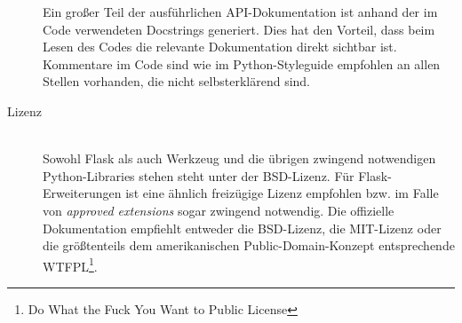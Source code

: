 \begin{description}
Ein großer Teil der ausführlichen API-Dokumentation ist anhand der im Code verwendeten Docstrings
generiert. Dies hat den Vorteil, dass beim Lesen des Codes die relevante Dokumentation direkt
sichtbar ist. Kommentare im Code sind wie im Python-Styleguide empfohlen an allen Stellen vorhanden,
die nicht selbsterklärend sind.

\newpage
\item[Lizenz] \hfill \\
Sowohl Flask als auch Werkzeug und die übrigen zwingend notwendigen Python-Libraries stehen steht
unter der BSD-Lizenz. Für Flask-Erweiterungen ist eine ähnlich freizügige Lizenz empfohlen bzw. im
Falle von \emph{approved extensions} sogar zwingend notwendig. Die offizielle Dokumentation
empfiehlt entweder die BSD-Lizenz, die MIT-Lizenz oder die größtenteils dem amerikanischen
Public-Domain-Konzept entsprechende WTFPL\footnote{Do What the Fuck You Want to Public License}.
\end{description}
